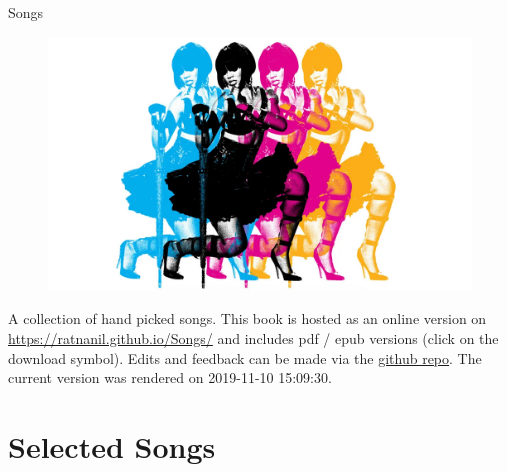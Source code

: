 \documentclass[]{book}
\title{}
\author{}
\date{}
\begin{document}

\begin{titlepage}
\begin{center}
  

\end{center}
\vspace{1.5cm}
\begin{center}

{\LARGE Songs}

\end{center}
 \vspace{1cm}

\begin{figure}[htbp]
  \centering
  \includegraphics[width=1\textwidth]{misc/title.png}
  \label{titelbild}
\end{figure}

\begin{center}
\textbf{}


\end{center} 

\vspace{1.0cm}


\end{titlepage}

{
\setcounter{tocdepth}{1}
\tableofcontents
}
A collection of hand picked songs. This book is hosted as an online version on \url{https://ratnanil.github.io/Songs/} and includes pdf / epub versions (click on the download symbol). Edits and feedback can be made via the \href{https://github.com/ratnanil/songs}{github repo}. The current version was rendered on 2019-11-10 15:09:30.

\hypertarget{selected-songs}{%
\chapter{Selected Songs}\label{selected-songs}}
\end{document}

